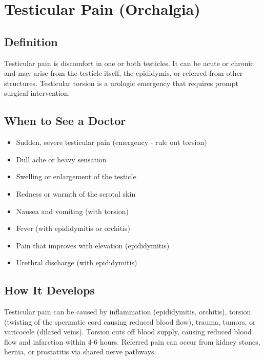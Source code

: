 \chapter{Testicular Pain (Orchalgia)}

\section*{Definition}
Testicular pain is discomfort in one or both testicles. It can be acute or chronic and may arise from the testicle itself, the epididymis, or referred from other structures. Testicular torsion is a urologic emergency that requires prompt surgical intervention.

\section*{When to See a Doctor}
\begin{itemize}
\item Sudden, severe testicular pain (emergency - rule out torsion)
\item Dull ache or heavy sensation
\item Swelling or enlargement of the testicle
\item Redness or warmth of the scrotal skin
\item Nausea and vomiting (with torsion)
\item Fever (with epididymitis or orchitis)
\item Pain that improves with elevation (epididymitis)
\item Urethral discharge (with epididymitis)
\end{itemize}

\section*{How It Develops}
Testicular pain can be caused by inflammation (epididymitis, orchitis), torsion (twisting of the spermatic cord causing reduced blood flow), trauma, tumors, or varicocele (dilated veins). Torsion cuts off blood supply, causing reduced blood flow and infarction within 4-6 hours. Referred pain can occur from kidney stones, hernia, or prostatitis via shared nerve pathways.

